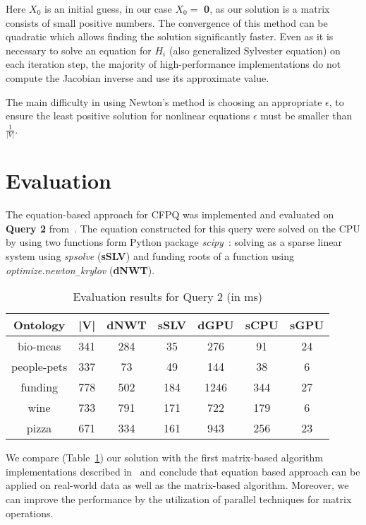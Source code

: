 \documentclass[sigconf]{acmart}
\begin{document}
Here $X_0$ is an initial guess, in our case $X_0 = $ \textbf{0}, as our solution is a matrix consists of small positive numbers. 
The convergence of this method can be quadratic which allows finding the solution significantly faster.
Even as it is necessary to solve an equation for $H_i$ (also generalized Sylvester equation) on each iteration step, the majority of high-performance implementations do not compute the Jacobian inverse and use its approximate value.

The main difficulty in using Newton's method is choosing an appropriate $\epsilon$, to ensure the least positive solution for nonlinear equations $\epsilon$ must be smaller than $\frac{1}{|V|}$.


\section{Evaluation}

The equation-based approach for CFPQ was implemented and evaluated on \textbf{Query 2} from~\cite{azimov2018context}.
The equation constructed for this query were solved on the CPU by using two functions form Python package \textit{scipy}~\cite{scipy}: 
solving as a sparse linear system using \textit{spsolve} (\textbf{sSLV})
and
funding roots of a function using \textit{optimize.newton\texttt{\_}krylov} (\textbf{dNWT}).

\begin{table}[h]
\centering
\caption{Evaluation results for Query 2 (in ms)}
\label{tbl2}
\begin{tabular}{ | c | c || c | c || c | c | c |}
\hline
Ontology    & |V| & dNWT & sSLV & dGPU & sCPU &  sGPU \\
\hline                           
\hline                           
bio-meas    & 341 &  284 & 35   & 276  & 91  & 24\\
people-pets & 337 &  73  & 49   & 144  & 38  & 6\\
funding     & 778 &  502 & 184  & 1246 & 344 & 27\\
wine        & 733 &  791 & 171  & 722  & 179 & 6\\
pizza       & 671 &  334 & 161  & 943  & 256 & 23\\
\hline
\end{tabular}

\end{table}

We compare (Table~\ref{tbl2}) our solution with the first matrix-based algorithm implementations described in~\cite{azimov2018context} and conclude that equation based approach can be applied on real-world data as well as the matrix-based algorithm. 
Moreover, we can improve the performance by the utilization of parallel techniques for matrix operations.
\end{document}
